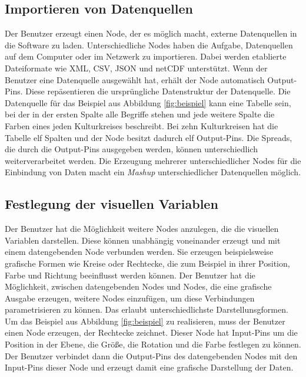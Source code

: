 \documentclass[a4paper, 
               12pt,
               DIV=calc,
               version=first,
               pdftex,
               headsepline,
               footsepline,
               bibtotocnumbered,
               liststotocnumbered]{scrreprt}
\begin{document}
\subsection{Importieren von Datenquellen}
Der Benutzer erzeugt einen Node, der es möglich macht, externe Datenquellen
in die Software zu laden. Unterschiedliche Nodes haben die Aufgabe, Datenquellen auf
dem Computer oder im Netzwerk zu importieren. Dabei werden etablierte
Dateiformate wie XML, CSV, JSON und netCDF unterstützt. Wenn der Benutzer eine 
Datenquelle ausgewählt hat, erhält der Node automatisch Output-Pins.
Diese repäsentieren die ursprüngliche Datenstruktur der Datenquelle.
Die Datenquelle für das Beispiel aus Abbildung \ref{fig:beispiel} kann eine Tabelle sein,
bei der in der ersten Spalte alle Begriffe stehen und jede weitere Spalte die Farben
eines jeden Kulturkreises beschreibt. Bei zehn Kulturkreisen hat die Tabelle
elf Spalten und der Node besitzt dadurch elf Output-Pins. Die Spreads, die durch
die Output-Pins ausgegeben werden, können unterschiedlich
weiterverarbeitet werden.
Die Erzeugung mehrerer unterschiedlicher Nodes für die Einbindung von Daten macht ein
\textit{Mashup} unterschiedlicher Datenquellen möglich.
\subsection{Festlegung der visuellen Variablen}
Der Benutzer hat die Möglichkeit weitere Nodes anzulegen, die die visuellen
Variablen darstellen. Diese können unabhängig voneinander erzeugt und mit einem datengebenden
Node verbunden werden. Sie erzeugen beispielsweise grafische Formen wie Kreise oder Rechtecke,
die zum Beispiel in ihrer Position, Farbe und Richtung beeinflusst werden können.
Der Benutzer hat die Möglichkeit, zwischen datengebenden Nodes und
Nodes, die eine grafische Ausgabe erzeugen, weitere Nodes einzufügen, um diese Verbindungen
parametrisieren zu können. Das erlaubt unterschiedlichste Darstellunsgformen.
Um das Beispiel aus Abbildung \ref{fig:beispiel} zu realisieren, muss der Benutzer einen
Node erzeugen, der Rechtecke zeichnet. Dieser Node hat Input-Pins um die Position
in der Ebene, die Größe, die Rotation und die Farbe festlegen zu können. Der Benutzer
verbindet dann die Output-Pins des datengebenden Nodes mit den Input-Pins dieser Node
und erzeugt damit eine grafische Darstellung der Daten.
\end{document}
